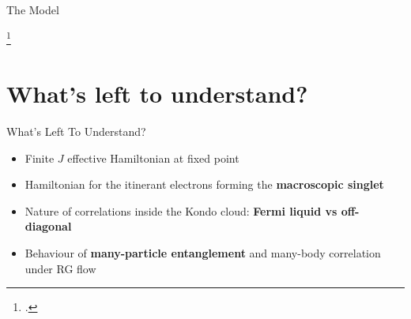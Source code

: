 \documentclass[aspectratio=169]{beamer}
\begin{document}
\begin{frame}[noframenumbering]{The Model}
{\begin{minipage}{0.6\textwidth}
\end{minipage}
\begin{minipage}{0.35\textwidth}
\end{minipage}
\footcite{anderson1969exact,anderson1970,wilson1975,andreiKondoreview,andrei_kondo,wiegmann_kondoexact_1981}
}
\end{frame}

\section{What's left to understand?}
\begin{frame}[noframenumbering]{What's Left To Understand?}
  
\begin{itemize}[<+-|alert@+>]
	\item Finite \(J\) effective Hamiltonian at fixed point
	\vspace*{20pt}
	\item Hamiltonian for the itinerant electrons forming the \textbf{macroscopic singlet}
	\vspace*{20pt}
	\item Nature of correlations inside the Kondo cloud: \textbf{Fermi liquid vs off-diagonal}
	\vspace*{20pt}
	\item Behaviour of \textbf{many-particle entanglement} and many-body correlation under RG flow
\end{itemize}

\end{frame}
\end{document}
